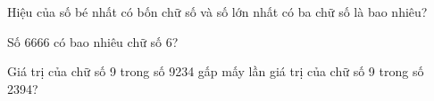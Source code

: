 \begin{ex}
Hiệu của số bé nhất có bốn chữ số và số lớn nhất có ba chữ số là bao nhiêu?
\end{ex}

\begin{ex}
Số 6666 có bao nhiêu chữ số 6?
\end{ex}

\begin{ex}
Giá trị của chữ số 9 trong số 9234 gấp mấy lần giá trị của chữ số 9 trong số 2394?
\end{ex}
